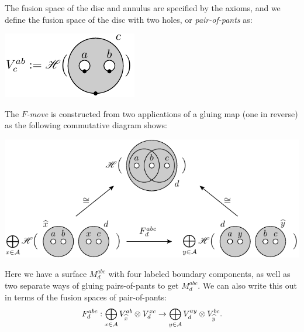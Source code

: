 \documentclass[aps, prl, letterpaper, twocolumn, superscriptaddress, notitlepage, 10pt]{revtex4-1}
\begin{document}
The fusion space of the disc and annulus are
specified by the axioms, and we define the fusion
space of the disc with two holes, or \emph{pair-of-pants} as:
\begin{center}
\includegraphics[]{pic-pop.pdf}
\end{center}

The \emph{$F$-move}
is constructed from two applications of a
gluing map (one in reverse) as the following commutative diagram shows:
\begin{center}
\includegraphics[]{pic-glue-fmove.pdf}
\end{center}
Here we have a surface $M^{abc}_d$ with 
four labeled boundary components, as well as two separate
ways of gluing pairs-of-pants to get $M^{abc}_d.$
We can also write this out in terms of the fusion spaces of pair-of-pants:
$$
    F^{abc}_d : \bigoplus_{x\in\mathcal{A}} V^{ab}_{\widehat{x}}\otimes V^{xc}_d 
        \to \bigoplus_{y\in\mathcal{A}} V^{ay}_d\otimes V^{bc}_{\widehat{y}}.
$$

\end{document}
